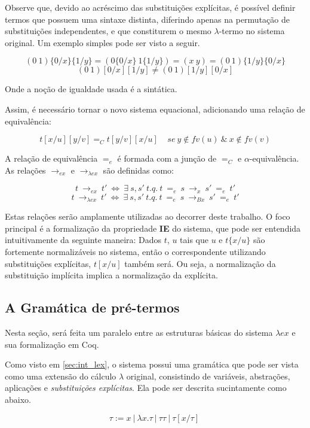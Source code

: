 Observe que, devido ao acréscimo das substituições explícitas, é possível
definir termos que possuem uma sintaxe distinta, diferindo apenas na permutação
de substituições independentes, e que constiturem o mesmo
$\lambda$-termo no sistema original. Um exemplo simples pode ser visto a seguir.

\[ (0\ 1) \{0/x\}\{1/y\} = (0\{0/x\}\ 1\{1/y\}) = (x\ y) =  (0\ 1) \{1/y\}\{0/x\} \]
\[ (0\ 1) [0/x][1/y] \neq  (0\ 1) [1/y][0/x] \]

Onde a noção de igualdade usada é a sintática.

Assim, é necessário tornar o novo sistema
equacional, adicionando uma relação de equivalência:

\[ t[x/u][y/v] =_C t[y/v][x/u] \ \ \ \ \ se\ y \notin fv(u)\ \&\ x \notin fv(v)\] 

A relação de equivalência $=_e$ é formada com a junção de $=_C$ e
$\alpha$-equivalência. As relações $\rightarrow_{ex}$ e $\rightarrow_{\lambda
    ex}$ são definidas como:

\[t\ \rightarrow_{ex}\ t'\ \iff\ \exists\ s,s'\ t.q.\ t\ =_{e}\ s\
    \rightarrow_x\ s'\ =_e\ t' \]
\[t\ \rightarrow_{\lambda ex}\ t'\ \iff\ \exists\ s,s'\ t.q.\ t\ =_{e}\ s\
    \rightarrow_{Bx}\ s'\ =_e\ t' \]

Estas relações serão amplamente utilizadas ao decorrer deste trabalho. 
O foco principal é a formalização da propriedade \textbf{IE} do sistema, que
pode ser entendida intuitivamente da seguinte maneira: Dados $t$,
$u$ tais que $u$ e $t\{x/u\}$ são fortemente normalizáveis
no sistema, então o correspondente utilizando substituições explícitas,
$t[x/u]$ também será. Ou seja, a normalização da substituição implícita
implica a normalização da explícita.

\subsection{A Gramática de pré-termos}
\label{sec:termos}

Nesta seção, será feita um paralelo entre as estruturas básicas do sistema
$\lambda ex$ e sua formalização em Coq.

Como visto em \ref{sec:int_lex}, o sistema possui uma gramática que pode ser vista como
uma extensão do cálculo $\lambda$ original, consistindo de variáveis, abstrações,
aplicações e \emph{substituições explícitas}. Ela pode ser descrita sucintamente
como abaixo.

\[ \tau := x\ |\ \lambda x.\tau\ |\ \tau \tau\ |\ \tau[x/\tau]\ \]

